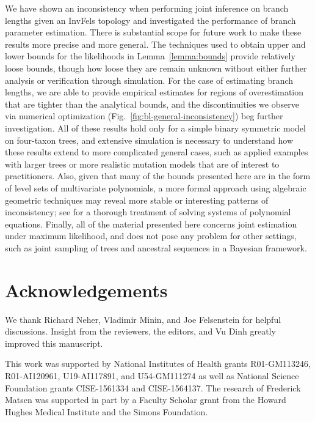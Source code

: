 \documentclass[11pt]{article}
\newcommand{\beginsupplement}{%
        \setcounter{table}{0}
        \renewcommand{\thetable}{S\arabic{table}}%
        \setcounter{figure}{0}
        \renewcommand{\thefigure}{S\arabic{figure}}%
     }
\begin{document}
We have shown an inconsistency when performing joint inference on branch lengths given an InvFels topology and investigated the performance of branch parameter estimation.
There is substantial scope for future work to make these results more precise and more general.
The techniques used to obtain upper and lower bounds for the likelihoods in Lemma~\ref{lemma:bounds} provide relatively loose bounds, though how loose they are remain unknown without either further analysis or verification through simulation.
For the case of estimating branch lengths, we are able to provide empirical estimates for regions of overestimation that are tighter than the analytical bounds, and the discontinuities we observe via numerical optimization (Fig.~\ref{fig:bl-general-inconsistency}) beg further investigation.
All of these results hold only for a simple binary symmetric model on four-taxon trees, and extensive simulation is necessary to understand how these results extend to more complicated general cases, such as applied examples with larger trees or more realistic mutation models that are of interest to practitioners.
Also, given that many of the bounds presented here are in the form of level sets of multivariate polynomials, a more formal approach using algebraic geometric techniques may reveal more stable or interesting patterns of inconsistency; see \citet{Sturmfels2002} for a thorough treatment of solving systems of polynomial equations.
Finally, all of the material presented here concerns joint estimation under maximum likelihood, and does not pose any problem for other settings, such as joint sampling of trees and ancestral sequences in a Bayesian framework.


\section*{Acknowledgements}
We thank Richard Neher, Vladimir Minin, and Joe Felsenstein for helpful discussions.
Insight from the reviewers, the editors, and Vu Dinh greatly improved this manuscript.

This work was supported by National Institutes of Health grants R01-GM113246, R01-AI120961, U19-AI117891, and U54-GM111274 as well as National Science Foundation grants CISE-1561334 and CISE-1564137.
The research of Frederick Matsen was supported in part by a Faculty Scholar grant from the Howard Hughes Medical Institute and the Simons Foundation.




\newpage
\beginsupplement


\end{document}
